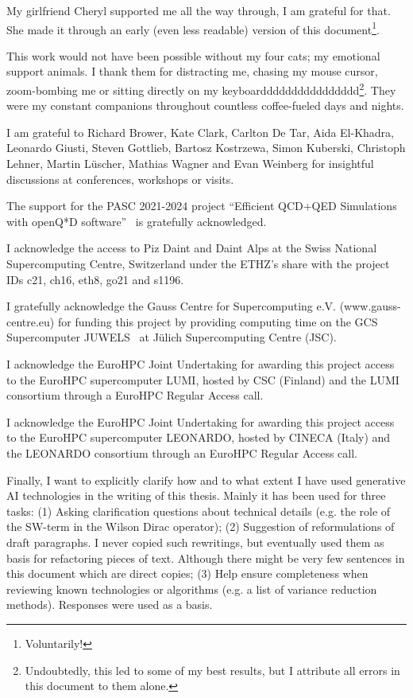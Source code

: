 My girlfriend Cheryl supported me all the way through, I am grateful for that.
She made it through an early (even less readable) version of this document\footnote{Voluntarily!}.

This work would not have been possible without my four cats;
my emotional support animals.
I thank them for distracting me, chasing my mouse cursor, zoom-bombing me or sitting directly on my keyboardddddddddddddddd\footnote{Undoubtedly, this led to some of my best results, but I attribute all errors in this document to them alone.}.
They were my constant companions throughout countless coffee-fueled days and nights.

I am grateful to Richard Brower, Kate Clark, Carlton De Tar, Aida El-Khadra, Leonardo Giusti, Steven Gottlieb, Bartosz Kostrzewa, Simon Kuberski, Christoph Lehner, Martin Lüscher, Mathias Wagner and Evan Weinberg for insightful discussions at conferences, workshops or visits.

The support for the PASC 2021-2024 project ``Efficient QCD+QED Simulations with openQ*D software''~\cite{online:pasc2021} is gratefully acknowledged.

I acknowledge the access to Piz Daint and Daint Alps at the Swiss National Supercomputing Centre, Switzerland under the ETHZ’s share with the project IDs c21, ch16, eth8, go21 and s1196.

I gratefully acknowledge the Gauss Centre for Supercomputing e.V. (www.gauss-centre.eu) for funding this project by providing computing time on the GCS Supercomputer JUWELS~\cite{juwels} at Jülich Supercomputing Centre (JSC). 

I acknowledge the EuroHPC Joint Undertaking for awarding this project access to the EuroHPC supercomputer LUMI, hosted by CSC (Finland) and the LUMI consortium through a EuroHPC Regular Access call.

I acknowledge the EuroHPC Joint Undertaking for awarding this project access to the EuroHPC supercomputer LEONARDO, hosted by CINECA (Italy) and the LEONARDO consortium through an EuroHPC Regular Access call.


Finally, I want to explicitly clarify how and to what extent I have used generative AI technologies in the writing of this thesis.
Mainly it has been used for three tasks:
(1) Asking clarification questions about technical details (e.g. the role of the SW-term in the Wilson Dirac operator);
(2) Suggestion of reformulations of draft paragraphs. 
I never copied such rewritings, but eventually used them as basis for refactoring pieces of text.
Although there might be very few sentences in this document which are direct copies;
(3) Help ensure completeness when reviewing known technologies or algorithms (e.g. a list of variance reduction methods).
Responses were used as a basis.


\endgroup

